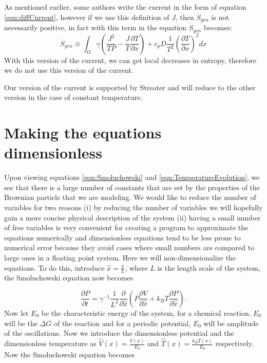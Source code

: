 As mentioned earlier, some authors write the current in the form of equation \ref{eqn:diffCurrent}, however if we use this definition of $J$, then $\dot{S}_{gen}$ is not necessarily positive, in fact with this term in the equation $\dot{S}_{gen}$ becomes:
\begin{equation}
\dot{S}_{gen} \equiv \int_{\Omega} \gamma \left(\frac{J^2}{T P} - \frac{J}{T} \frac{\partial T}{\partial x} \right) + c_p D \frac{1}{T^2} \left(\frac{\partial T}{\partial x} \right)^2 dx 
\end{equation}
With this version of the current, we can get local decreases in entropy, therefore we do not use this version of the current.

Our version of the current is supported by Streater \cite{Streater1997, Streater1997a,Streater2000,Streater1997b} and will reduce to the other version in the case of constant temperature.

\section{Making the equations dimensionless}  \label{dimensionless}

Upon viewing equations \ref{eqn:Smoluchowski} and \ref{eqn:TemperatureEvolution}, we see that there is a large number of constants that are set by the properties of the Brownian particle that we are modeling. We would like to reduce the number of variables for two reasons (i) by reducing the number of variables we will hopefully gain a more concise physical description of the system (ii) having a small number of free variables is very convenient for creating a program to approximate the equations numerically and dimensionless equations tend to be less prone to numerical error because they avoid cases where small numbers are compared to large ones in a floating point system.
Here we will non-dimensionalize the equations. To do this, introduce $\hat{x} = \frac{x}{L}$, where $L$ is the length scale of the system, the Smoluchowski equation now becomes

\begin{equation}
\frac{\partial P}{\partial t} = \gamma^{-1}\frac{1}{L^2} \frac{\partial}{\partial \hat{x}} \left (P \frac{\partial V}{\partial \hat{x}} + k_B T \frac{\partial P}{\partial \hat{x}} \right ).
\end{equation}
Now let $E_0$ be the characteristic energy of the system, for a chemical reaction, $E_0$ will be the $\Delta G$ of the reaction and for a periodic potential, $E_0$ will be amplitude of the oscillations. Now we introduce the dimensionless potential and the dimensionless temperature as $\hat{V}(x) = \frac{V(x)}{E_0}$ and $\hat{T}(x) = \frac{k_B T(x)}{E_0}$ respectively. Now the Smoluchowski equation becomes


